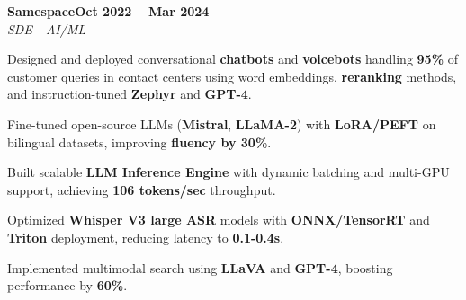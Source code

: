 \documentclass[letterpaper,10pt]{article}
\newcommand{\heading}[2]{
  \hspace{10pt}#1\hfill#2\\
}
\newcommand{\headingBf}[2]{
  \heading{\textbf{#1}}{\textbf{#2}}
}
\newcommand{\headingIt}[2]{
  \heading{\textit{#1}}{\textit{#2}}
}
\newenvironment{resume_list}{
  \vspace{-7pt}
  \begin{itemize}[itemsep=-2px, parsep=1pt, leftmargin=30pt]
}{
  \end{itemize}
}
\begin{document}
  


  \headingBf{Samespace}{Oct 2022 -- Mar 2024}
\headingIt{SDE - AI/ML}{}
\begin{resume_list}
  \item Designed and deployed conversational \textbf{chatbots} and \textbf{voicebots} handling \textbf{95\%} of customer queries in contact centers using word embeddings, \textbf{reranking} methods, and instruction-tuned \textbf{Zephyr} and \textbf{GPT-4}.

    \item Fine-tuned open-source LLMs (\textbf{Mistral}, \textbf{LLaMA-2}) with \textbf{LoRA/PEFT} on bilingual datasets, improving \textbf{fluency by 30\%}.

      \item Built scalable \textbf{LLM Inference Engine} with dynamic batching and multi-GPU support, achieving \textbf{106 tokens/sec} throughput.

  

  

    \item Optimized \textbf{Whisper V3 large ASR} models with \textbf{ONNX/TensorRT} and \textbf{Triton} deployment, reducing latency to \textbf{0.1-0.4s}.


  

    \item Implemented multimodal search using \textbf{LLaVA} and \textbf{GPT-4}, boosting performance by \textbf{60\%}.

\end{resume_list}
\end{document}
